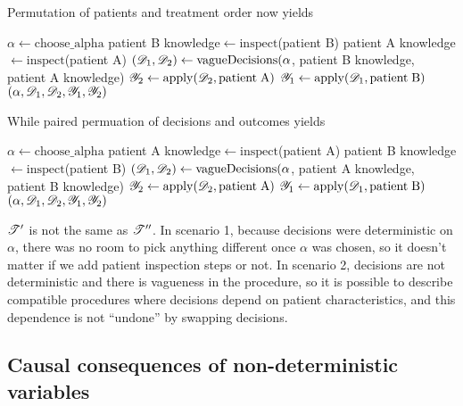 Permutation of patients and treatment order now yields

\begin{algorithmic}
    \State $\alpha \gets \mathrm{choose\_alpha}$
    \State patient B knowledge$\gets \mathrm{inspect}$(patient B)
    \State patient A knowledge$\gets \mathrm{inspect}$(patient A)
    \State $(\mathscr{D}_1,\mathscr{D}_2) \gets \mathrm{vagueDecisions}(\alpha$, patient B knowledge, patient A knowledge)
    \State $\mathscr{Y}_2\gets \mathrm{apply}(\mathscr{D}_2,\mathrm{patient\;A})$
    \State $\mathscr{Y}_1\gets \mathrm{apply}(\mathscr{D}_1,\mathrm{patient\;B})$
    \State \Return $(\alpha,\mathscr{D}_1,\mathscr{D}_2,\mathscr{Y}_1,\mathscr{Y}_2)$
    \EndProcedure
\end{algorithmic}

While paired permuation of decisions and outcomes yields

\begin{algorithmic}
    \State $\alpha \gets \mathrm{choose\_alpha}$
    \State patient A knowledge$\gets \mathrm{inspect}$(patient A)
    \State patient B knowledge$\gets \mathrm{inspect}$(patient B)
    \State $(\mathscr{D}_1,\mathscr{D}_2) \gets \mathrm{vagueDecisions}(\alpha$, patient A knowledge, patient B knowledge)
    \State $\mathscr{Y}_2\gets \mathrm{apply}(\mathscr{D}_2,\mathrm{patient\;A})$
    \State $\mathscr{Y}_1\gets \mathrm{apply}(\mathscr{D}_1,\mathrm{patient\;B})$
    \State \Return $(\alpha,\mathscr{D}_1,\mathscr{D}_2,\mathscr{Y}_1,\mathscr{Y}_2)$
    \EndProcedure
\end{algorithmic}

$\mathscr{T}'$ is not the same as $\mathscr{T}''$. In scenario 1, because decisions were deterministic on $\alpha$, there was no room to pick anything different once $\alpha$ was chosen, so it doesn't matter if we add patient inspection steps or not. In scenario 2, decisions are not deterministic and there is vagueness in the procedure, so it is possible to describe compatible procedures where decisions depend on patient characteristics, and this dependence is not ``undone'' by swapping decisions.


\subsection{Causal consequences of non-deterministic variables}

